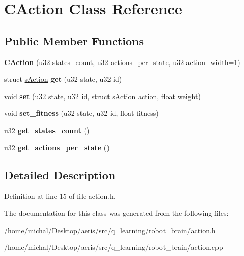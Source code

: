 \hypertarget{classCAction}{\section{C\-Action Class Reference}
\label{classCAction}
}
\subsection*{Public Member Functions}
\begin{DoxyCompactItemize}
\item 
\hypertarget{classCAction_ac8a8e24ea6760d3412de5c0a539f525a}{{\bfseries C\-Action} (u32 states\-\_\-count, u32 actions\-\_\-per\-\_\-state, u32 action\-\_\-width=1)}\label{classCAction_ac8a8e24ea6760d3412de5c0a539f525a}

\item 
\hypertarget{classCAction_a83bcaebe14483446f2ebf80da1815d0b}{struct \hyperlink{structsAction}{s\-Action} {\bfseries get} (u32 state, u32 id)}\label{classCAction_a83bcaebe14483446f2ebf80da1815d0b}

\item 
\hypertarget{classCAction_a74d07494be896f28e4411136461d4fea}{void {\bfseries set} (u32 state, u32 id, struct \hyperlink{structsAction}{s\-Action} action, float weight)}\label{classCAction_a74d07494be896f28e4411136461d4fea}

\item 
\hypertarget{classCAction_a6afc90e884cecec5ede8cc848462659a}{void {\bfseries set\-\_\-fitness} (u32 state, u32 id, float fitness)}\label{classCAction_a6afc90e884cecec5ede8cc848462659a}

\item 
\hypertarget{classCAction_a38cbdf586510e1d654dbdc9f7ccfb981}{u32 {\bfseries get\-\_\-states\-\_\-count} ()}\label{classCAction_a38cbdf586510e1d654dbdc9f7ccfb981}

\item 
\hypertarget{classCAction_a54d2b7c1e70d854f8ee26edbbcc71a67}{u32 {\bfseries get\-\_\-actions\-\_\-per\-\_\-state} ()}\label{classCAction_a54d2b7c1e70d854f8ee26edbbcc71a67}

\end{DoxyCompactItemize}


\subsection{Detailed Description}


Definition at line 15 of file action.\-h.



The documentation for this class was generated from the following files\-:\begin{DoxyCompactItemize}
\item 
/home/michal/\-Desktop/aeris/src/q\-\_\-learning/robot\-\_\-brain/action.\-h\item 
/home/michal/\-Desktop/aeris/src/q\-\_\-learning/robot\-\_\-brain/action.\-cpp\end{DoxyCompactItemize}
